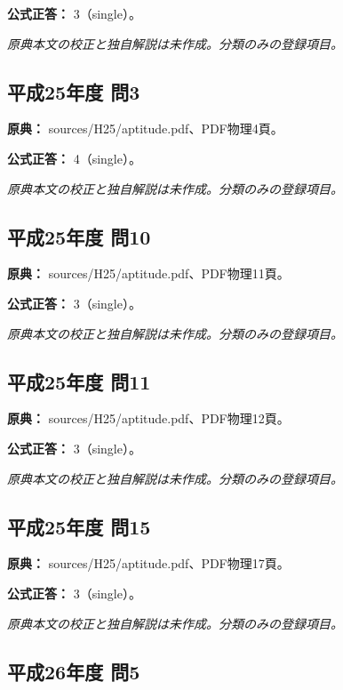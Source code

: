 \textbf{公式正答：} 3（single）。

\par\textit{原典本文の校正と独自解説は未作成。分類のみの登録項目。}

\subsection{平成25年度 問3}
\label{q:h25-reg-apt-03}

\noindent\textbf{原典：} sources/H25/aptitude.pdf、PDF物理4頁。

\textbf{公式正答：} 4（single）。

\par\textit{原典本文の校正と独自解説は未作成。分類のみの登録項目。}

\subsection{平成25年度 問10}
\label{q:h25-reg-apt-10}

\noindent\textbf{原典：} sources/H25/aptitude.pdf、PDF物理11頁。

\textbf{公式正答：} 3（single）。

\par\textit{原典本文の校正と独自解説は未作成。分類のみの登録項目。}

\subsection{平成25年度 問11}
\label{q:h25-reg-apt-11}

\noindent\textbf{原典：} sources/H25/aptitude.pdf、PDF物理12頁。

\textbf{公式正答：} 3（single）。

\par\textit{原典本文の校正と独自解説は未作成。分類のみの登録項目。}

\subsection{平成25年度 問15}
\label{q:h25-reg-apt-15}

\noindent\textbf{原典：} sources/H25/aptitude.pdf、PDF物理17頁。

\textbf{公式正答：} 3（single）。

\par\textit{原典本文の校正と独自解説は未作成。分類のみの登録項目。}

\subsection{平成26年度 問5}
\label{q:h26-reg-apt-05}

